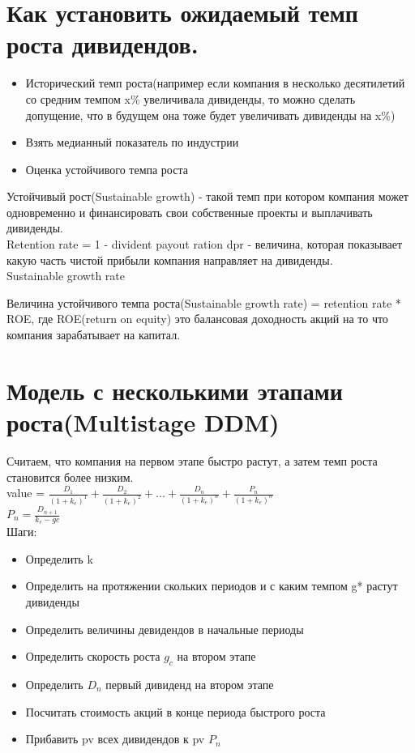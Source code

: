 \documentclass{article}
\begin{document}
\section{Как установить ожидаемый темп роста дивидендов.}
\begin{itemize}
    \item Исторический темп роста(например если компания в несколько десятилетий со средним  темпом x\% увеличивала дивиденды, то можно сделать допущение, что в будущем она тоже будет увеличивать дивиденды на x\%) 
    \item Взять медианный показатель по индустрии
    \item Оценка устойчивого темпа роста 
\end{itemize}
  Устойчивый рост(Sustainable growth) - такой темп при котором компания может одновременно и финансировать свои собственные проекты и выплачивать дивиденды.\\

Retention rate = 1 - divident payout ration
dpr - величина, которая показывает какую часть чистой прибыли компания направляет на дивиденды.\\
Sustainable growth rate 

Величина устойчивого темпа роста(Sustainable growth rate) = retention rate * ROE, где ROE(return on equity) это балансовая доходность акций на то что компания зарабатывает на капитал.
\newpage
\section{Модель с несколькими этапами роста(Multistage DDM)}
Считаем, что компания на первом этапе быстро растут, а затем темп роста становится более низким.\\
value = $\frac{D_1}{(1+k_e)^1} + \frac{D_2}{(1+k_e)^2} + ... + \frac{D_n}{(1+k_e)^n} + \frac{P_n}{(1+k_e)^n}$\\
$P_n = \frac{D_{n + 1}}{k_e - gc}$\\
Шаги:
\begin{itemize}
    \item Определить k
    \item Определить на протяжении скольких периодов и с каким темпом g* растут дивиденды
    \item Определить величины девидендов в начальные периоды
    \item Определить скорость роста $g_c$ на втором этапе
    \item Определить $D_n$ первый дивиденд на втором этапе
    \item Посчитать стоимость акций в конце периода быстрого роста
    \item Прибавить pv всех дивидендов к pv $P_n$ 
\end{itemize}
\end{document}
